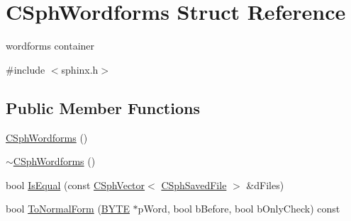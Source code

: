 \hypertarget{structCSphWordforms}{\section{C\-Sph\-Wordforms Struct Reference}
\label{structCSphWordforms}
}


wordforms container  




{\ttfamily \#include $<$sphinx.\-h$>$}

\subsection*{Public Member Functions}
\begin{DoxyCompactItemize}
\item 
\hyperlink{structCSphWordforms_a921fb15e9922f3e9c97a9ac4b4eee4a7}{C\-Sph\-Wordforms} ()
\item 
\hyperlink{structCSphWordforms_aba8aac8d8721dd1d8222e73058cbb064}{$\sim$\-C\-Sph\-Wordforms} ()
\item 
bool \hyperlink{structCSphWordforms_ac36e6e387090cd8f15aba0459c90f4cc}{Is\-Equal} (const \hyperlink{classCSphVector}{C\-Sph\-Vector}$<$ \hyperlink{structCSphSavedFile}{C\-Sph\-Saved\-File} $>$ \&d\-Files)
\item 
bool \hyperlink{structCSphWordforms_aeb2d13528b65d8f81975895d197536a0}{To\-Normal\-Form} (\hyperlink{sphinxstd_8h_a4ae1dab0fb4b072a66584546209e7d58}{B\-Y\-T\-E} $\ast$p\-Word, bool b\-Before, bool b\-Only\-Check) const 
\end{DoxyCompactItemize}
